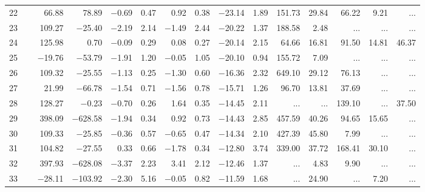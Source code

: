 \begin{table*}[p]
{\begin{tabular}{l@{ }r@{ \ }rr@{ \ }rr@{ \ }rrrr@{ \ }r@{ \ }r@{ \ }r@{ \ }r}
 22   \ \dotfill \  &     66.88 &     78.89 &  $-$0.69 &   0.47 &    0.92 &   0.38& $-$23.14 &   1.89&      151.73 &       29.84 &       66.22 &        9.21 &    ...       \\     
 23   \ \dotfill \  &    109.27 &   $-$25.40 &  $-$2.19 &   2.14 &  $-$1.49 &   2.44& $-$20.22 &   1.37&      188.58 &        2.48 &    ...     &    ...     &    ...       \\     
 24   \ \dotfill \  &    125.98 &      0.70 &  $-$0.09 &   0.29 &    0.08 &   0.27& $-$20.14 &   2.15&       64.66 &       16.81 &       91.50 &       14.81 &       46.37   \\     
 25   \ \dotfill \  &   $-$19.76 &   $-$53.79 &  $-$1.91 &   1.20 &  $-$0.05 &   1.05& $-$20.10 &   0.94&      155.72 &        7.09 &    ...     &    ...     &    ...       \\     
 26   \ \dotfill \  &    109.32 &   $-$25.55 &  $-$1.13 &   0.25 &  $-$1.30 &   0.60& $-$16.36 &   2.32&      649.10 &       29.12 &       76.13 &    ...     &    ...       \\     
 27   \ \dotfill \  &     21.99 &   $-$66.78 &  $-$1.54 &   0.71 &  $-$1.56 &   0.78& $-$15.71 &   1.26&       96.70 &       13.81 &       37.69 &    ...     &    ...       \\     
 28   \ \dotfill \  &    128.27 &    $-$0.23 &  $-$0.70 &   0.26 &    1.64 &   0.35& $-$14.45 &   2.11&    ...     &    ...     &      139.10 &    ...     &       37.50   \\     
 29   \ \dotfill \  &    398.09 &  $-$628.58 &  $-$1.94 &   0.34 &    0.92 &   0.73& $-$14.43 &   2.85&      457.59 &       40.26 &       94.65 &       15.65 &    ...       \\     
 30   \ \dotfill \  &    109.33 &   $-$25.85 &  $-$0.36 &   0.57 &  $-$0.65 &   0.47& $-$14.34 &   2.10&      427.39 &       45.80 &        7.99 &    ...     &    ...       \\     
 31   \ \dotfill \  &    104.82 &   $-$27.55 &    0.33 &   0.66 &  $-$1.78 &   0.34& $-$12.80 &   3.74&      339.00 &       37.72 &      168.41 &       30.10 &    ...       \\     
 32   \ \dotfill \  &    397.93 &  $-$628.08 &  $-$3.37 &   2.23 &    3.41 &   2.12& $-$12.46 &   1.37&    ...     &        4.83 &        9.90 &    ...     &    ...       \\     
 33   \ \dotfill \  &   $-$28.11 &  $-$103.92 &  $-$2.30 &   5.16 &  $-$0.05 &   0.82& $-$11.59 &   1.68&    ...     &       24.90 &    ...     &        7.20 &    ...       \\     

\end{tabular}}
\end{table*}
